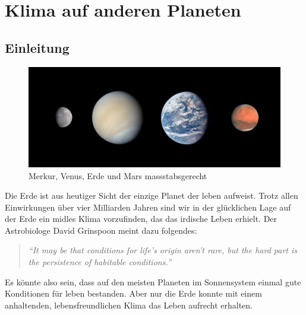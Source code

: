 %
%
%

\chapter{Klima auf anderen Planeten\label{chapter:thema}}
\begin{refsection}

\section{Einleitung}

\begin{figure}
	\centering
	\includegraphics[width=0.7\linewidth, trim={0 2cm 0 2cm},clip]{planeten/Pictures/planets2.jpg}
	\caption{Merkur, Venus, Erde und Mars massstabsgerecht}
\end{figure}

Die Erde ist aus heutiger Sicht der einzige Planet der leben aufweist. Trotz allen Einwirkungen über vier Milliarden Jahren sind wir in der glücklichen Lage auf der Erde ein midles Klima vorzufinden, das das irdische Leben erhielt. 
Der Astrobiologe David Grinspoon meint dazu folgendes:
\begin{quote}
\textit{“It may be that conditions for life’s origin aren’t rare, but the hard part is the persistence of habitable conditions.”} \\
\end{quote}
Es könnte also sein, dass auf den meisten Planeten im Sonnensystem einmal gute Konditionen für leben bestanden. Aber nur die Erde konnte mit einem anhaltenden, lebensfreundlichen Klima das Leben aufrecht erhalten.


\end{refsection}

